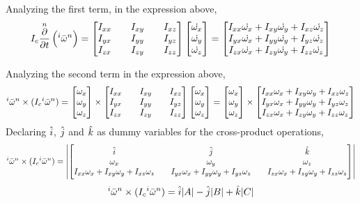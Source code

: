 \documentclass[class=report, 12pt, crop=false]{standalone}
\begin{document}
\begin{center}
Analyzing the first term, in the expression above,
$$I_c\overset{n}{\frac{\partial}{\partial t}}\left({}^i\bar{\omega}^n\right) = \begin{bmatrix}
I_{xx} && I_{xy} && I_{xz} \\
I_{yx} && I_{yy} && I_{yz} \\
I_{zx} && I_{zy} && I_{zz}
\end{bmatrix} \begin{bmatrix}
\dot{\omega_x} \\ \dot{\omega_y} \\ \dot{\omega_z}
\end{bmatrix} = \begin{bmatrix} 
I_{xx}\dot{\omega_x} + I_{xy}\dot{\omega_y} + I_{xz}\dot{\omega_z} \\
I_{yx}\dot{\omega_x} + I_{yy}\dot{\omega_y} + I_{yz}\dot{\omega_z} \\
I_{zx}\dot{\omega_x} + I_{zy}\dot{\omega_y} + I_{zz}\dot{\omega_z}
\end{bmatrix}$$

Analyzing the second term in the expression above,
$${}^i\bar{\omega}^n\times (I_c {}^i\bar{\omega}^n) = \begin{bmatrix}
\omega_x \\ \omega_y \\ \omega_z
\end{bmatrix}\times\begin{bmatrix}
I_{xx} && I_{xy} && I_{xz} \\
I_{yx} && I_{yy} && I_{yz} \\
I_{zx} && I_{zy} && I_{zz}
\end{bmatrix}\begin{bmatrix}
\omega_x \\ \omega_y \\ \omega_z
\end{bmatrix} = \begin{bmatrix}
\omega_x \\ \omega_y \\ \omega_z
\end{bmatrix}\times\begin{bmatrix}
I_{xx}\omega_x + I_{xy}\omega_y + I_{xz}\omega_z \\
I_{yx}\omega_x + I_{yy}\omega_y + I_{yz}\omega_z \\
I_{zx}\omega_x + I_{zy}\omega_y + I_{zz}\omega_z
\end{bmatrix}$$
Declaring $\hat{i}$, $\hat{j}$ and $\hat{k}$ as dummy variables for the cross-product operations,
$${}^i\bar{\omega}^n\times (I_c {}^i\bar{\omega}^n) = \left|\begin{bmatrix}
\hat{i} && \hat{j} && \hat{k} \\
\omega_x && \omega_y && \omega_z \\
I_{xx}\omega_x + I_{xy}\omega_y + I_{xz}\omega_z && I_{yx}\omega_x + I_{yy}\omega_y + I_{yz}\omega_z && I_{zx}\omega_x + I_{zy}\omega_y + I_{zz}\omega_z
\end{bmatrix}\right|$$
$${}^i\bar{\omega}^n\times (I_c {}^i\bar{\omega}^n) = \hat{i}|A| - \hat{j}|B| + \hat{k}|C|$$


\end{center}
\end{document}
